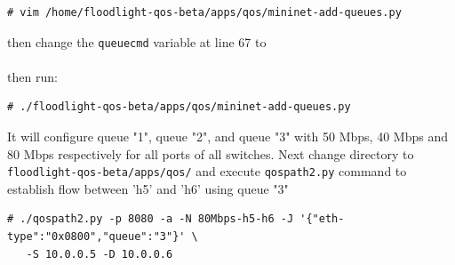 \documentclass[a4paper]{article}
\begin{document}
\begin{verbatim}
# vim /home/floodlight-qos-beta/apps/qos/mininet-add-queues.py
\end{verbatim}
then change the \texttt{queuecmd} variable at line 67 to \\

\small{} \\

\noindent then run:
\begin{verbatim}
# ./floodlight-qos-beta/apps/qos/mininet-add-queues.py
\end{verbatim}

It will configure queue "1", queue "2", and queue "3" with 50 Mbps, 40 Mbps and 80 Mbps respectively for all ports of all switches. Next change directory to \texttt{floodlight-qos-beta/apps/qos/} and execute \texttt{qospath2.py} command to establish flow between 'h5' and 'h6' using queue "3"
\begin{verbatim}
# ./qospath2.py -p 8080 -a -N 80Mbps-h5-h6 -J '{"eth-type":"0x0800","queue":"3"}' \
   -S 10.0.0.5 -D 10.0.0.6
\end{verbatim}

\end{document}
